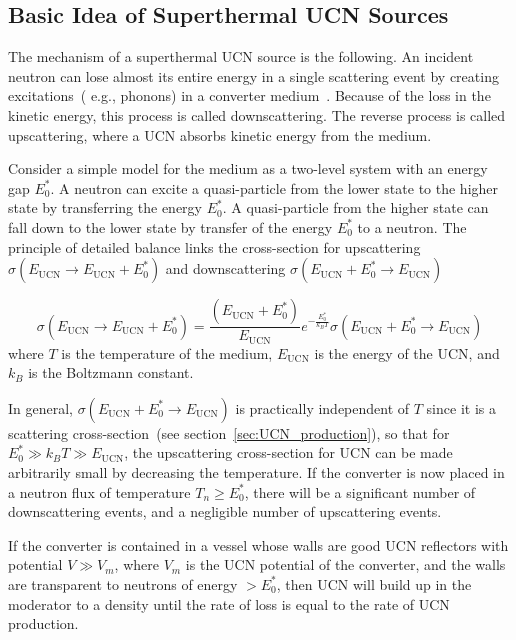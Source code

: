  
\subsection{Basic Idea of Superthermal UCN Sources\label{sec:basic_idea}}
The mechanism of a superthermal UCN source is the following.  An
incident neutron can lose almost its entire energy in a single
scattering event by creating excitations~( e.g., phonons) in a
converter medium~\cite{ucnbook, Golub75}. Because of the loss in the
kinetic energy, this process is called downscattering. The reverse
process is called upscattering, where a UCN absorbs kinetic energy from
the medium.


Consider a simple model for the medium as a two-level system with an
energy gap $E_0^*$. A neutron can excite a quasi-particle from the
lower state to the higher state by transferring the energy $E_0^*$. A
quasi-particle from the higher state can fall down to the lower state
by transfer of the energy $E_0^*$ to a neutron.  The principle of
detailed balance links the cross-section for upscattering
$\sigma(E_{\text{UCN}} \rightarrow E_{\text{UCN}}+E_0^*)$ and
downscattering
$\sigma(E_{\text{UCN}} + E_0^*\rightarrow
E_{\text{UCN}}) $~\cite{ucnbook}

\begin{equation}
\label{eqn:detailed_balance}
\sigma(E_{\text{UCN}} \rightarrow E_{\text{UCN}}+E_0^*)= \frac{(E_{\text{UCN}}+E_0^*)}{E_{\text{UCN}}}
e^{-\frac{E_0^*}{k_B T}}\sigma(E_{\text{UCN}}+E_0^* \rightarrow E_{\text{UCN}} )
\end{equation}
where $T$ is the temperature of the medium, $E_{\text{UCN}}$ is the
energy of the UCN, and $k_B$ is the Boltzmann constant.

In general, $\sigma(E_{\text{UCN}} + E_0^* \rightarrow E_{\text{UCN}})$
is practically independent of $T$ since it is a scattering
cross-section~(see section~\ref{sec:UCN_production}), so that for
$E_0^* \gg k_B T \gg E_{\text{UCN}}$, the upscattering cross-section
for UCN can be made arbitrarily small by decreasing the
temperature. If the converter is now placed in a neutron flux of
temperature $T_n \geq E_0^*$, there will be a significant number of
downscattering events, and a negligible number of upscattering events.

If the converter is contained in a vessel whose walls are good UCN
reflectors with potential $V \gg V_m$, where $V_m$ is the UCN potential
of the converter, and the walls are transparent to neutrons of
energy $> E_0^*$, then UCN will build up in the moderator to a density
until the rate of loss is equal to the rate of UCN production.

